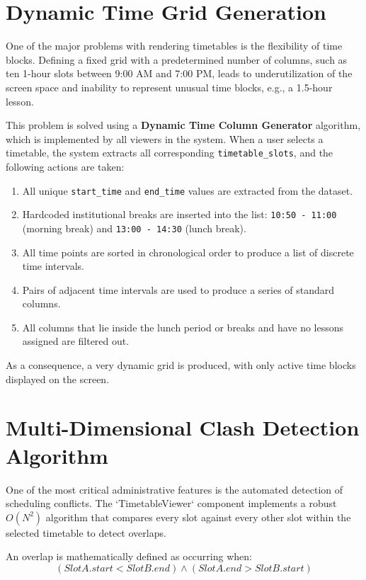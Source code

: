 \section{Dynamic Time Grid Generation}

One of the major problems with rendering timetables is the flexibility of time blocks. Defining a fixed grid with a predetermined number of columns, such as ten 1-hour slots between 9:00 AM and 7:00 PM, leads to underutilization of the screen space and inability to represent unusual time blocks, e.g., a 1.5-hour lesson.

This problem is solved using a \textbf{Dynamic Time Column Generator} algorithm, which is implemented by all viewers in the system. When a user selects a timetable, the system extracts all corresponding \texttt{timetable\_slots}, and the following actions are taken:
\begin{enumerate}
    \item All unique \texttt{start\_time} and \texttt{end\_time} values are extracted from the dataset.
    \item Hardcoded institutional breaks are inserted into the list: \texttt{10:50 - 11:00} (morning break) and \texttt{13:00 - 14:30} (lunch break).
    \item All time points are sorted in chronological order to produce a list of discrete time intervals.
    \item Pairs of adjacent time intervals are used to produce a series of standard columns.
    \item All columns that lie inside the lunch period or breaks and have no lessons assigned are filtered out.
\end{enumerate}

As a consequence, a very dynamic grid is produced, with only active time blocks displayed on the screen.
\section{Multi-Dimensional Clash Detection Algorithm}

One of the most critical administrative features is the automated detection of scheduling conflicts. The `TimetableViewer` component implements a robust $O(N^2)$ algorithm that compares every slot against every other slot within the selected timetable to detect overlaps.

An overlap is mathematically defined as occurring when:
\begin{equation}
    (SlotA.start < SlotB.end) \land (SlotA.end > SlotB.start)
\end{equation}

